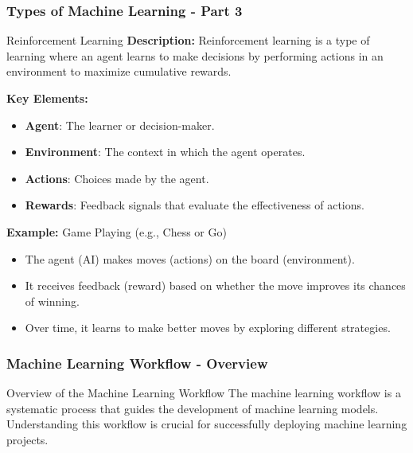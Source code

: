 \documentclass[aspectratio=169]{beamer}
\begin{document}
\begin{frame}[fragile]
    \frametitle{Types of Machine Learning - Part 3}
    \begin{block}{Reinforcement Learning}
        \textbf{Description:}
        Reinforcement learning is a type of learning where an agent learns to make decisions by performing actions in an environment to maximize cumulative rewards.

        \textbf{Key Elements:}
        \begin{itemize}
            \item \textbf{Agent}: The learner or decision-maker.
            \item \textbf{Environment}: The context in which the agent operates.
            \item \textbf{Actions}: Choices made by the agent.
            \item \textbf{Rewards}: Feedback signals that evaluate the effectiveness of actions.
        \end{itemize}
        
        \textbf{Example:} Game Playing (e.g., Chess or Go)
        \begin{itemize}
            \item The agent (AI) makes moves (actions) on the board (environment).
            \item It receives feedback (reward) based on whether the move improves its chances of winning.
            \item Over time, it learns to make better moves by exploring different strategies.
        \end{itemize}
    \end{block}
\end{frame}

\begin{frame}[fragile]
    \frametitle{Machine Learning Workflow - Overview}
    \begin{block}{Overview of the Machine Learning Workflow}
        The machine learning workflow is a systematic process that guides the development of machine learning models. Understanding this workflow is crucial for successfully deploying machine learning projects.
    \end{block}
\end{frame}
\end{document}
